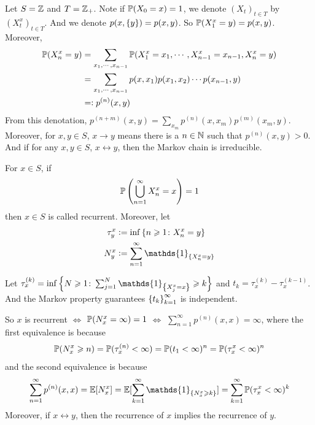 \documentclass[a4paper,12pt]{article}
\begin{document}
\begin{itemize}
  \noindent Let $S = \mathbb{Z}$ and $T=\mathbb{Z}_+$. Note if $\mathbb{P}(X_0 = x) =1$, we denote $(X_t)_{t \in T}$ by $(X_t^x)_{t \in T}$. And we denote $p(x, \left\{y\right\}) = p(x,y)$. So $\mathbb{P}(X_1^x = y) = p(x,y)$. Moreover,
  \begin{equation*}
    \begin{split}
      \mathbb{P}(X_n^x = y) &= \sum_{x_1,\cdots,x_{n-1}}\mathbb{P}(X_1^x = x_1,\cdots,X_{n-1}^x=x_{n-1},X_n^{x}=y) \\
      &= \sum_{x_1,\cdots,x_{n-1}} p(x,x_1)p(x_1,x_2)\cdots p(x_{n-1},y) \\
      &=\vcentcolon p^{(n)}(x,y)
    \end{split}
  \end{equation*}
  From this denotation, $p^{(n+m)}(x,y) = \sum_{x_m}p^{(n)}(x,x_m)p^{(m)}(x_m,y)$. Moreover, for $x,y \in S$, $x\rightarrow y$ means there is a $n\in \mathbb{N}$ such that $p^{(n)}(x,y) > 0$. And if for any $x, y\in S$, $x \leftrightarrow y$, then the Markov chain is irreducible.

  \noindent For $x \in S$, if 
  \begin{equation*}
    \mathbb{P}\left(\bigcup_{n=1}^{\infty}X_n^x=x\right) = 1
  \end{equation*}
  then $x \in S$ is called recurrent. Moreover, let
  \begin{equation*}
    \begin{split}
      \tau_y^x &\defeq \inf\bb{n \geqslant 1 \colon X_n^x = y} \\
      N_y^x &\defeq \sum_{n=1}^{\infty}\mathds{1}_{\bb{X_n^x = y}}
    \end{split}
  \end{equation*}
  \begin{rmk}
    Let $\tau_x^{(k)} = \inf\bb{N \geqslant 1 \colon \sum_{j=1}^N \mathds{1}_{\bb{X_j^x = x}} \geqslant k}$ and $t_k = \tau_x^{(k)} -\tau_x^{(k-1)}$. And the Markov property guarantees $\left\{t_k\right\}_{k=1}^{\infty}$ is independent.
  \end{rmk}
  So $x$ is recurrent $\Leftrightarrow$ $\mathbb{P}(N_x^x = \infty) = 1$ $\Leftrightarrow$ $\sum_{n=1}^{\infty}p^{(n)}(x,x) =\infty$, where the first equivalence is because
  \begin{equation*}
    \mathbb{P}(N_x^x \geqslant n) = \mathbb{P}(\tau_x^{(n)} < \infty) = \mathbb{P}(t_1 < \infty)^n = \mathbb{P}(\tau_x^x < \infty)^n
  \end{equation*}
  and the second equivalence is because
  \begin{equation*}
    \sum_{n=1}^{\infty}p^{(n)}(x,x) = \E[N_x^x] = \E[\sum_{k=1}^{\infty}\mathds{1}_{\bb{N_x^x \geqslant k}}] = \sum_{k=1}^{\infty}\Pb(\tau_x^x < \infty)^k
  \end{equation*}
  Moreover, if $x\leftrightarrow y$, then the recurrence of $x$ implies the recurrence of $y$.


\end{itemize}
\end{document}
